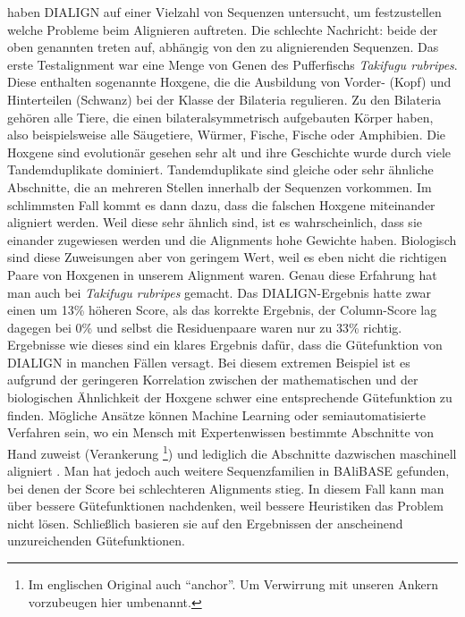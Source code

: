 \cite{mpps06} haben DIALIGN auf einer Vielzahl von Sequenzen untersucht, um festzustellen welche Probleme beim Alignieren auftreten. Die schlechte Nachricht: beide der oben genannten treten auf, abhängig von den zu alignierenden Sequenzen. Das erste Testalignment war eine Menge von Genen des Pufferfischs \emph{Takifugu rubripes}. Diese enthalten sogenannte Hoxgene, die die Ausbildung von Vorder- (Kopf) und Hinterteilen (Schwanz) bei der Klasse der Bilateria regulieren. Zu den Bilateria gehören alle Tiere, die einen bilateralsymmetrisch aufgebauten Körper haben, also beispielsweise alle Säugetiere, Würmer, Fische, Fische oder Amphibien. Die Hoxgene sind evolutionär gesehen sehr alt und ihre Geschichte wurde durch viele Tandemduplikate dominiert. Tandemduplikate sind gleiche oder sehr ähnliche Abschnitte, die an mehreren Stellen innerhalb der Sequenzen vorkommen. Im schlimmsten Fall kommt es dann dazu, dass die falschen Hoxgene miteinander aligniert werden. Weil diese sehr ähnlich sind, ist es wahrscheinlich, dass sie einander zugewiesen werden und die Alignments hohe Gewichte haben. Biologisch sind diese Zuweisungen aber von geringem Wert, weil es eben nicht die richtigen Paare von Hoxgenen in unserem Alignment waren. Genau diese Erfahrung hat man auch bei \emph{Takifugu rubripes} gemacht. Das DIALIGN-Ergebnis hatte zwar einen um 13\% höheren Score, als das korrekte Ergebnis, der Column-Score lag dagegen bei 0\% und selbst die Residuenpaare waren nur zu 33\% richtig. Ergebnisse wie dieses sind ein klares Ergebnis dafür, dass die Gütefunktion von DIALIGN in manchen Fällen versagt. Bei diesem extremen Beispiel ist es aufgrund der geringeren Korrelation zwischen der mathematischen und der biologischen Ähnlichkeit der Hoxgene schwer eine entsprechende Gütefunktion zu finden. Mögliche Ansätze können Machine Learning oder semiautomatisierte Verfahren sein, wo ein Mensch mit Expertenwissen bestimmte Abschnitte von Hand zuweist (Verankerung \footnote{Im englischen Original auch \enquote{anchor}. Um Verwirrung mit unseren Ankern vorzubeugen hier umbenannt.}) und lediglich die Abschnitte dazwischen maschinell aligniert \citep{mpps06}. Man hat jedoch auch weitere Sequenzfamilien in BAliBASE gefunden, bei denen der Score bei schlechteren Alignments stieg. In diesem Fall kann man über bessere Gütefunktionen nachdenken, weil bessere Heuristiken das Problem nicht lösen. Schließlich basieren sie auf den Ergebnissen der anscheinend unzureichenden Gütefunktionen.

